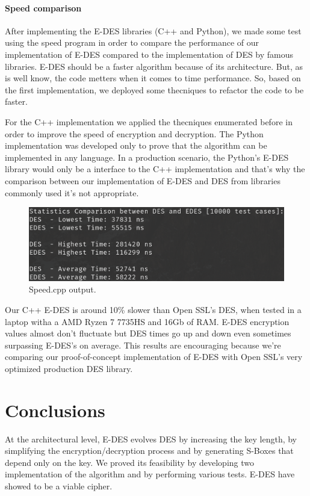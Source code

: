 \documentclass{article} %
\begin{document}
\paragraph{Speed comparison}

After implementing the E-DES libraries (C++ and Python), we made some test using the speed program in order to compare the performance of our implementation
of E-DES compared to the implementation of DES by famous libraries. E-DES should be a faster algorithm because of its architecture. But, as is well know, the code metters
when it comes to time performance. So, based on the first implementation, we deployed some thecniques to refactor the code to be faster.

For the C++ implementation we applied the thecniques enumerated before in order to improve the speed of encryption and decryption. The Python implementation was developed only to prove that
the algorithm can be implemented in any language. In a production scenario, the Python's E-DES library would only be a interface to the C++ implementation and that's  why the comparison
between our implementation of E-DES and DES from libraries commonly used it's not appropriate.

\begin{figure}[h]
  \center
  \includegraphics[scale=0.2]{assets/speed.png}
  \caption{Speed.cpp output.}
\end{figure}

Our C++ E-DES is around 10\% slower than Open SSL's DES, when tested in a laptop witha a AMD Ryzen 7 7735HS and 16Gb of RAM. E-DES encryption values almost don't fluctuate but
DES times go up and down even sometimes surpassing E-DES's on average. This results are encouraging because we're comparing our proof-of-concept implementation of E-DES with Open 
SSL's very optimized production DES library.

\section{Conclusions}

At the architectural level, E-DES evolves DES by increasing the key length, by simplifying the encryption/decryption process and by generating S-Boxes that depend only
on the key. We proved its feasibility by developing two implementation of the algorithm and by performing various tests. E-DES have showed to be 
a viable cipher.
\end{document}
